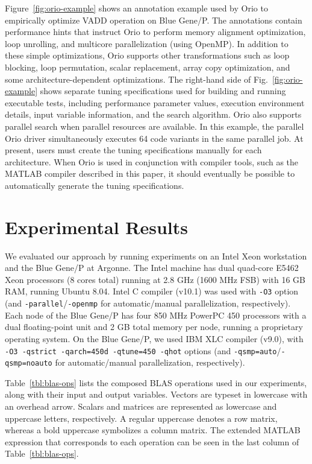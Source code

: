 \documentclass[runningheads]{llncs}
\begin{document}
Figure~\ref{fig:orio-example} shows an annotation example used by Orio to
empirically optimize VADD operation on Blue Gene/P. The annotations contain
performance hints that instruct Orio to perform memory alignment
optimization, loop unrolling, and multicore parallelization (using
OpenMP). In addition to these simple optimizations, Orio supports other
transformations such as loop blocking, loop permutation, scalar replacement,
array copy optimization, and some architecture-dependent optimizations. The
right-hand side of Fig.~\ref{fig:orio-example} shows separate tuning
specifications used for building and running executable tests, including
performance parameter values, execution environment details, input variable
information, and the search algorithm. Orio also supports parallel search
when parallel resources are available. In this example, the parallel Orio
driver simultaneously executes 64 code variants in the same parallel job. 
At present, users must create the tuning specifications manually for
each architecture. When Orio is used in conjunction with compiler
tools, such as the MATLAB compiler described in this paper, it should
eventually be possible to automatically generate the tuning
specifications.


\section{Experimental Results}
\label{sec:experiments}

We evaluated our approach by running experiments on an Intel Xeon
workstation and the Blue Gene/P at Argonne. The Intel machine has dual
quad-core E5462 Xeon processors (8 cores total) running at 2.8 GHz
(1600 MHz FSB) with 16 GB RAM, running Ubuntu 8.04. Intel C compiler
(v10.1) was used with \texttt{-O3} option (and
\texttt{-parallel}/\texttt{-openmp} for automatic/manual
parallelization, respectively). Each node of the Blue Gene/P has four
850 MHz PowerPC 450 processors with a dual floating-point unit and 2
GB total memory per node, running a proprietary operating system. On the
Blue Gene/P, we used IBM XLC compiler (v9.0), with \texttt{-O3
-qstrict -qarch=450d -qtune=450 -qhot} options (and
\texttt{-qsmp=auto}/\texttt{-qsmp=noauto} for automatic/manual
parallelization, respectively).

Table~\ref{tbl:blas-ops} lists the composed BLAS operations used in our
experiments, along with their input and output variables. Vectors are typeset
in lowercase with an overhead arrow. Scalars and matrices are represented as
lowercase and uppercase letters, respectively. A regular uppercase denotes a
row matrix, whereas a bold uppercase symbolizes a column matrix. The extended
MATLAB expression that corresponds to each operation can be seen in the last
column of Table~\ref{tbl:blas-ops}.
\end{document}
